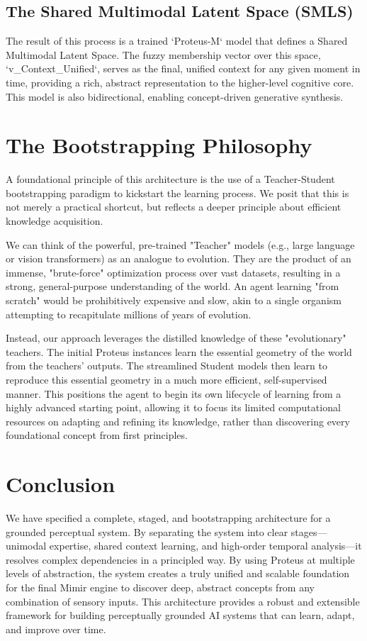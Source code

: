 \documentclass{article}
\begin{document}
\subsection{The Shared Multimodal Latent Space (SMLS)}
The result of this process is a trained `Proteus-M` model that defines a Shared Multimodal Latent Space. The fuzzy membership vector over this space, `v_Context_Unified`, serves as the final, unified context for any given moment in time, providing a rich, abstract representation to the higher-level cognitive core. This model is also bidirectional, enabling concept-driven generative synthesis.

\section{The Bootstrapping Philosophy}

A foundational principle of this architecture is the use of a Teacher-Student bootstrapping paradigm to kickstart the learning process. We posit that this is not merely a practical shortcut, but reflects a deeper principle about efficient knowledge acquisition.

We can think of the powerful, pre-trained "Teacher" models (e.g., large language or vision transformers) as an analogue to evolution. They are the product of an immense, "brute-force" optimization process over vast datasets, resulting in a strong, general-purpose understanding of the world. An agent learning "from scratch" would be prohibitively expensive and slow, akin to a single organism attempting to recapitulate millions of years of evolution.

Instead, our approach leverages the distilled knowledge of these "evolutionary" teachers. The initial Proteus instances learn the essential geometry of the world from the teachers' outputs. The streamlined Student models then learn to reproduce this essential geometry in a much more efficient, self-supervised manner. This positions the agent to begin its own lifecycle of learning from a highly advanced starting point, allowing it to focus its limited computational resources on adapting and refining its knowledge, rather than discovering every foundational concept from first principles.

\section{Conclusion}

We have specified a complete, staged, and bootstrapping architecture for a grounded perceptual system. By separating the system into clear stages---unimodal expertise, shared context learning, and high-order temporal analysis---it resolves complex dependencies in a principled way. By using Proteus at multiple levels of abstraction, the system creates a truly unified and scalable foundation for the final Mimir engine to discover deep, abstract concepts from any combination of sensory inputs. This architecture provides a robust and extensible framework for building perceptually grounded AI systems that can learn, adapt, and improve over time.



\end{document}
